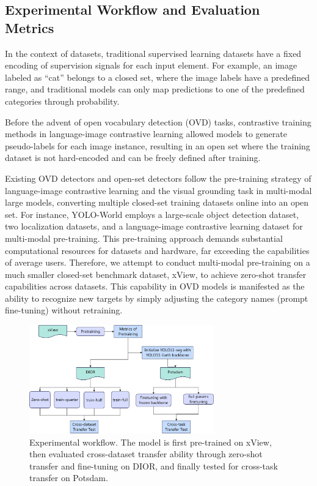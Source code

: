 \documentclass{article}
\begin{document}
\subsection{Experimental Workflow and Evaluation Metrics}

In the context of datasets, traditional supervised learning datasets have a fixed  
encoding of supervision signals for each input element. For example, an image  
labeled as “cat” belongs to a closed set, where the image labels have a  
predefined range, and traditional models can only map predictions to one of the  
predefined categories through probability.  

Before the advent of open vocabulary detection (OVD) tasks, contrastive training  
methods in language-image contrastive learning allowed models to generate  
pseudo-labels for each image instance, resulting in an open set where the  
training dataset is not hard-encoded and can be freely defined after training.  

Existing OVD detectors and open-set detectors follow the pre-training strategy of  
language-image contrastive learning and the visual grounding task in multi-modal  
large models, converting multiple closed-set training datasets online into an  
open set. For instance, YOLO-World employs a large-scale object detection  
dataset, two localization datasets, and a language-image contrastive learning  
dataset for multi-modal pre-training. This pre-training approach demands  
substantial computational resources for datasets and hardware, far exceeding the  
capabilities of average users. Therefore, we attempt to conduct multi-modal  
pre-training on a much smaller closed-set benchmark dataset, xView, to achieve  
zero-shot transfer capabilities across datasets. This capability in OVD models  
is manifested as the ability to recognize new targets by simply adjusting the  
category names (prompt fine-tuning) without retraining.  

\begin{figure}[htbp]
    \centering
    \includegraphics[width=8cm]{../image/3.png}
    \caption{Experimental workflow. The model is first pre-trained on xView, then evaluated cross-dataset transfer ability through zero-shot transfer and fine-tuning on DIOR, and finally tested for cross-task transfer on Potsdam.}
    \label{fig:experimental-workflow}
\end{figure}
\end{document}

